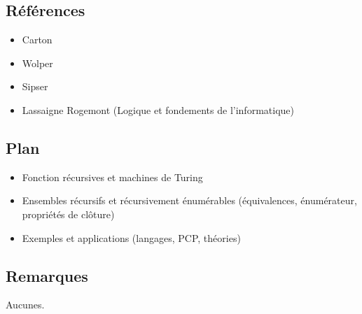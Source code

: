 \documentclass[../../agregation.tex]{subfiles}
\begin{document}

\dvts

\subsection{Références}

\begin{itemize}
	\item Carton
	\item Wolper
	\item Sipser
	\item Lassaigne Rogemont (Logique et fondements de l'informatique)
	
\end{itemize}

\subsection{Plan}

\begin{itemize}
	\item Fonction récursives et machines de Turing
	\item Ensembles récursifs et récursivement énumérables (équivalences, énumérateur, propriétés de clôture)
	\item Exemples et applications (langages, PCP, théories)
\end{itemize}

\subsection{Remarques}

Aucunes.
\end{document}
